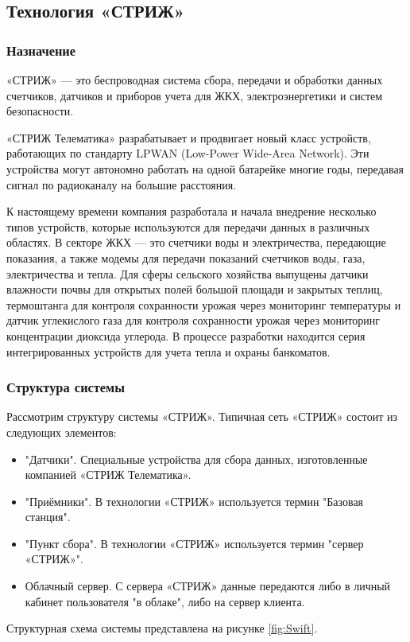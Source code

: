 \subsection{Технология «СТРИЖ»}
\subsubsection{Назначение}
«СТРИЖ» — это беспроводная система сбора, передачи и обработки данных счетчиков, датчиков и приборов учета для ЖКХ, электроэнергетики и систем безопасности.

«СТРИЖ Телематика» разрабатывает и продвигает новый класс устройств, работающих по стандарту LPWAN (Low-Power Wide-Area Network). Эти устройства могут автономно работать на одной батарейке многие годы, передавая сигнал по радиоканалу на большие расстояния. 


К настоящему времени компания разработала и начала внедрение несколько типов устройств, которые используются для передачи данных в различных областях. В секторе ЖКХ — это счетчики воды и электричества, передающие показания, а также модемы для передачи показаний счетчиков воды, газа, электричества и тепла. Для сферы сельского хозяйства выпущены датчики влажности почвы для открытых полей большой площади и закрытых теплиц, термоштанга для контроля сохранности урожая через мониторинг температуры и датчик углекислого газа для контроля сохранности урожая через мониторинг концентрации диоксида углерода. В процессе разработки находится серия интегрированных устройств для учета тепла и охраны банкоматов.

\subsubsection{Структура системы}
Рассмотрим структуру системы «СТРИЖ». Типичная сеть «СТРИЖ» состоит из следующих элементов: 
\begin{itemize}
	\item"Датчики". Специальные устройства для сбора данных, изготовленные компанией «СТРИЖ Телематика».  
	\item"Приёмники". В технологии «СТРИЖ» используется термин "Базовая станция".
	\item"Пункт сбора". В технологии «СТРИЖ» используется термин "сервер «СТРИЖ»".
	\item Облачный сервер. С сервера «СТРИЖ» данные передаются либо в личный кабинет пользователя "в облаке", либо на сервер клиента.
\end{itemize}
Структурная схема системы представлена на рисунке
\ref{fig:Swift}.

